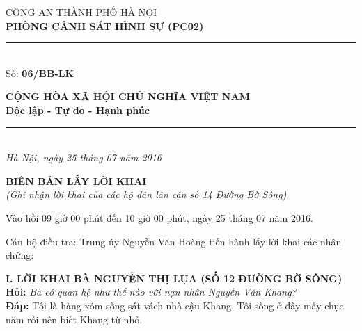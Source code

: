 \documentclass[12pt,a4paper]{article}
\begin{document}
\noindent
\begin{minipage}[t]{0.46\textwidth}
    \begin{center}
        \fontsize{11pt}{13pt}\selectfont
        CÔNG AN THÀNH PHỐ HÀ NỘI\\
        \textbf{PHÒNG CẢNH SÁT HÌNH SỰ (PC02)}\\[-0.2em]
        \rule{3.2cm}{0.6pt}\\[0.25cm]
        \fontsize{11pt}{13pt}\selectfont Số: \textbf{06/BB-LK}
    \end{center}
\end{minipage}
\hfill
\begin{minipage}[t]{0.52\textwidth}
    \begin{center}
        \fontsize{11pt}{13pt}\selectfont
        \textbf{CỘNG HÒA XÃ HỘI CHỦ NGHĨA VIỆT NAM}\\
        \textbf{Độc lập - Tự do - Hạnh phúc}\\[-0.2em]
        \rule{3.6cm}{0.6pt}\\[0.25cm]
        \textit{Hà Nội, ngày 25 tháng 07 năm 2016}
    \end{center}
\end{minipage}

\vspace{0.5cm}

\begin{center}
    \textbf{\Large BIÊN BẢN LẤY LỜI KHAI}\\[0.15cm]
    \textit{(Ghi nhận lời khai của các hộ dân lân cận số 14 Đường Bờ Sông)}
\end{center}

\vspace{0.3cm}


Vào hồi 09 giờ 00 phút đến 10 giờ 00 phút, ngày 25 tháng 07 năm 2016.

Cán bộ điều tra: Trung úy Nguyễn Văn Hoàng tiến hành lấy lời khai các nhân chứng:




\vspace{0.3cm}\noindent\textbf{\large I. LỜI KHAI BÀ NGUYỄN THỊ LỤA (SỐ 12 ĐƯỜNG BỜ SÔNG)}\\[0.15cm]

\noindent\textbf{Hỏi:} \textit{Bà có quan hệ như thế nào với nạn nhân Nguyễn Văn Khang?}\\[0.15cm]
\noindent\textbf{Đáp:} Tôi là hàng xóm sống sát vách nhà cậu Khang. Tôi sống ở đây mấy chục năm rồi nên biết Khang từ nhỏ.\\[0.35cm]
\end{document}
